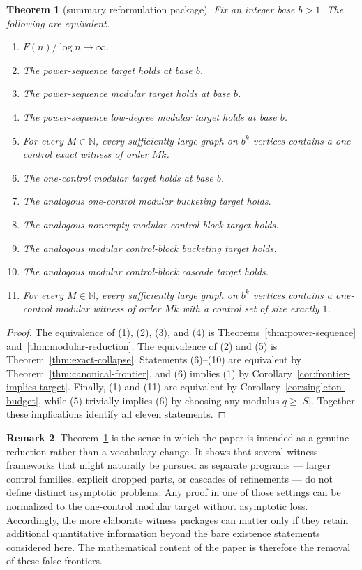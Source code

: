 \documentclass[11pt]{amsart}
\newtheorem{theorem}{Theorem}[section]
\theoremstyle{definition}
\newtheorem{remark}[theorem]{Remark}
\newcommand{\N}{\mathbb{N}}
\begin{document}
\begin{theorem}[summary reformulation package]\label{thm:summary-package}
Fix an integer base $b>1$. The following are equivalent.
\begin{enumerate}
  \item $F(n)/\log n \to \infty$.
  \item The power-sequence target holds at base $b$.
  \item The power-sequence modular target holds at base $b$.
  \item The power-sequence low-degree modular target holds at base $b$.
  \item For every $M \in \N$, every sufficiently large graph on $b^k$ vertices contains a
    one-control exact witness of order $Mk$.
  \item The one-control modular target holds at base $b$.
  \item The analogous one-control modular bucketing target holds.
  \item The analogous nonempty modular control-block target holds.
  \item The analogous modular control-block bucketing target holds.
  \item The analogous modular control-block cascade target holds.
  \item For every $M \in \N$, every sufficiently large graph on $b^k$ vertices contains a
    one-control modular witness of order $Mk$ with a control set of size exactly $1$.
\end{enumerate}
\end{theorem}

\begin{proof}
The equivalence of (1), (2), (3), and (4) is Theorems~\ref{thm:power-sequence}
and~\ref{thm:modular-reduction}. The equivalence of (2) and (5) is
Theorem~\ref{thm:exact-collapse}. Statements (6)--(10) are equivalent by
Theorem~\ref{thm:canonical-frontier}, and (6) implies (1) by
Corollary~\ref{cor:frontier-implies-target}. Finally, (1) and (11) are equivalent by
Corollary~\ref{cor:singleton-budget}, while (5) trivially implies (6) by choosing any modulus
$q \ge |S|$. Together these implications identify all eleven statements.
\end{proof}

\begin{remark}
Theorem~\ref{thm:summary-package} is the sense in which the paper is intended as a genuine
reduction rather than a vocabulary change. It shows that several witness frameworks that might
naturally be pursued as separate programs --- larger control families, explicit dropped parts, or
cascades of refinements --- do not define distinct asymptotic problems. Any proof in one of those
settings can be normalized to the one-control modular target without asymptotic loss. Accordingly,
the more elaborate witness packages can matter only if they retain additional quantitative
information beyond the bare existence statements considered here. The mathematical content of the
paper is therefore the removal of these false frontiers.
\end{remark}
\end{document}
